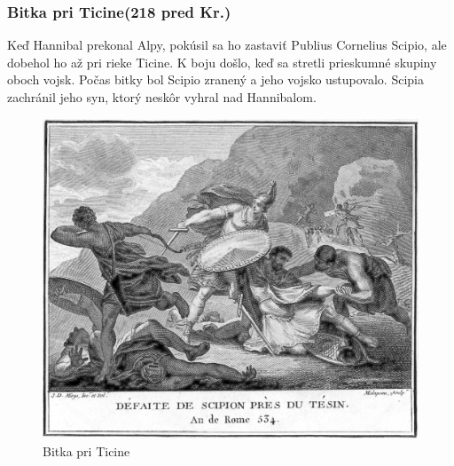 \documentclass{article}
\begin{document}
\subsubsection{Bitka pri Ticine(218 pred Kr.)}
Keď Hannibal prekonal Alpy, pokúsil sa ho zastaviť Publius Cornelius Scipio, ale dobehol ho až pri rieke Ticine.
K boju došlo, keď sa stretli prieskumné skupiny oboch vojsk. 
Počas bitky bol Scipio zranený a jeho vojsko ustupovalo.
Scipia zachránil jeho syn, ktorý neskôr vyhral nad Hannibalom.
\begin{figure}
\center
\includegraphics[scale=0.2]{ticinus.jpg}
\caption{Bitka pri Ticine}
\end{figure}
\newpage
\end{document}
